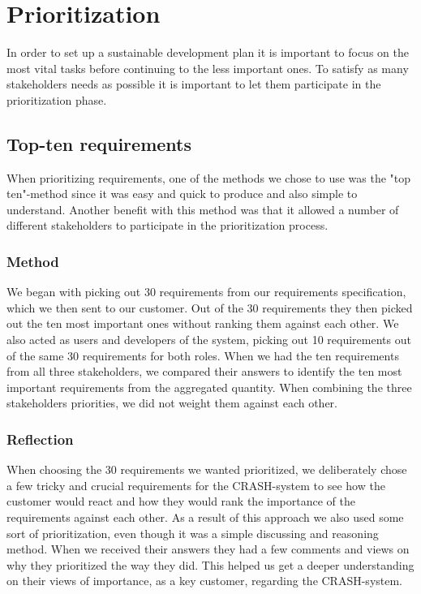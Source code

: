 \documentclass[10pt]{article}
\begin{document}
\section{Prioritization}
In order to set up a sustainable development plan it is important to focus on the most vital tasks before continuing to the less important ones. To satisfy as many stakeholders needs as possible it is important to let them participate in the prioritization phase.

\subsection{Top-ten requirements}
When prioritizing requirements, one of the methods we chose to use was the "top ten"-method since it was easy and quick to produce and also simple to understand. Another benefit with this method was that it allowed a number of different stakeholders to participate in the prioritization process.
\subsubsection{Method}
We began with picking out 30 requirements from our requirements specification, which we then sent to our customer. Out of the 30 requirements they then picked out the ten most important ones without ranking them against each other. We also acted as users and developers of the system, picking out 10 requirements out of the same 30 requirements for both roles. When we had the ten requirements from all three stakeholders, we compared their answers to identify the ten most important requirements from the aggregated quantity. When combining the three stakeholders priorities, we did not weight them against each other. 
\subsubsection{Reflection}
When choosing the 30 requirements we wanted prioritized, we deliberately chose a few tricky and crucial requirements for the CRASH-system to see how the customer would react and how they would rank the importance of the requirements against each other. As a result of this approach we also used some sort of prioritization, even though it was a simple discussing and reasoning method. When we received their answers they had a few comments and views on why they prioritized the way they did. This helped us get a deeper understanding on their views of importance, as a key customer, regarding the CRASH-system. 
\end{document}
